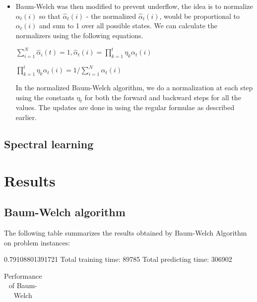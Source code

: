 \documentclass[letterpaper]{article}
\begin{document}
\begin{itemize}
	\item Baum-Welch was then modified  to prevent underflow, the idea is to normalize $\alpha_t(i)$ so that $\hat{\alpha}_{t}(i)$ - the normalized $\hat{\alpha}_{t}(i)$, would be proportional to $\alpha_{t}(i)$ and sum to 1 over all possible states. We can calculate the normalizers using the following equations. 
	      
	      \begin{center}
	      	
	      	$\sum_{i=1}^{N}\hat{\alpha}_{i}(t) = 1 , \hat{\alpha}_{t}(i) = \prod_{k=1}^t\eta_{k}\alpha_{t}(i)$ 
	      	
	      	$\prod_{k=1}^t\eta_{k}\alpha_{t}(i) = 1/\sum_{i=1}^N\alpha_{t}(i)$
	      	
	      \end{center}
	      
	      In the normalized Baum-Welch algorithm, we do a normalization at each step using the constants $\eta_{t}$ for both the forward and backward steps for all the values. The updates are done in using the regular formulae as described earlier.
	       
\end{itemize}

\subsection{Spectral learning}



\section{Results}

\subsection{Baum-Welch algorithm}
The following table summarizes the results obtained by Baum-Welch Algorithm on problem instances:

0.79108801391721
Total training time: 89785
Total predicting time: 306902


\begin{table}[h]
	\caption{Performance of Baum-Welch}
	\label{sample-table}
	\begin{center}
		\begin{tabular}{llll}\end{tabular}
	\end{center}
\end{table}
\end{document}
